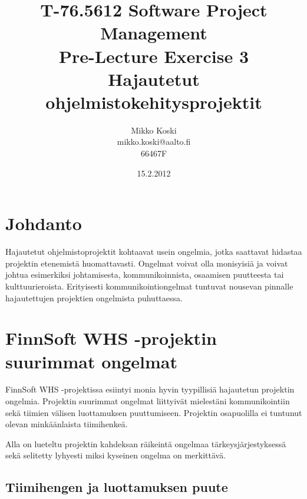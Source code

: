 \documentclass[a4paper]{article}
\begin{document}
\title{\small T-76.5612 Software Project Management \\ Pre-Lecture Exercise 3 \\ \huge Hajautetut ohjelmistokehitysprojektit}
\date{15.2.2012}
\author{Mikko Koski \\ mikko.koski@aalto.fi \\ 66467F}
\maketitle

\normalsize

\section{Johdanto}

Hajautetut ohjelmistoprojektit kohtaavat usein ongelmia, jotka saattavat hidastaa projektin etenemistä huomattavasti. Ongelmat voivat olla monisyisiä ja voivat johtua esimerkiksi johtamisesta, kommunikoinnista, osaamisen puutteesta tai kulttuurieroista. Erityisesti kommunikointiongelmat tuntuvat nousevan pinnalle hajautettujen projektien ongelmista puhuttaessa.

\section{FinnSoft WHS -projektin suurimmat ongelmat}

FinnSoft WHS -projektissa esiintyi monia hyvin tyypillisiä hajautetun projektin ongelmia. Projektin suurimmat ongelmat liittyivät mielestäni kommunikointiin sekä tiimien välisen luottamuksen puuttumiseen. Projektin osapuolilla ei tuntunut olevan minkäänlaista tiimihenkeä.

Alla on lueteltu projektin kahdeksan räikeintä ongelmaa tärkeysjärjestyksessä sekä selitetty lyhyesti miksi kyseinen ongelma on merkittävä.



\subsection{Tiimihengen ja luottamuksen puute}
\end{document}

